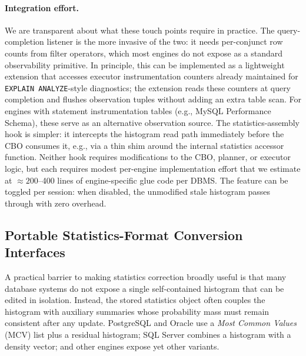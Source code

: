 \documentclass[runningheads]{llncs}
\begin{document}
\paragraph{Integration effort.}
We are transparent about what these touch points require in practice.
The query-completion listener is the more invasive of the two: it needs per-conjunct
row counts from filter operators, which most engines do not expose as a standard
observability primitive. In principle, this can be implemented as a
lightweight extension that accesses executor instrumentation counters already
maintained for \texttt{EXPLAIN ANALYZE}-style diagnostics; the extension reads
these counters at query completion and flushes observation tuples without adding
an extra table scan. For engines with statement instrumentation tables (e.g.,
MySQL Performance Schema), these serve as an alternative observation source.
The statistics-assembly hook is simpler: it intercepts the histogram read path
immediately before the CBO consumes it, e.g., via a thin shim
around the internal statistics accessor function.
Neither hook requires modifications to the CBO, planner, or executor logic, but
each requires modest per-engine implementation effort that we estimate at
${\approx}200$--400 lines of engine-specific glue code per DBMS.
The feature can be toggled per session: when disabled, the unmodified stale
histogram passes through with zero overhead.

\subsection{Portable Statistics-Format Conversion Interfaces}
\label{sec:mcv-adapter}

A practical barrier to making statistics correction broadly useful is that many
database systems do not expose a single self-contained histogram that can be
edited in isolation. Instead, the stored statistics object often couples the
histogram with auxiliary summaries whose probability mass must remain
consistent after any update. PostgreSQL and Oracle use a \emph{Most Common
Values} (MCV) list plus a residual histogram; SQL Server combines a histogram
with a density vector; and other engines expose yet other variants.
\end{document}
